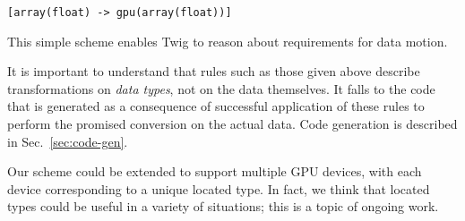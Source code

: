 \begin{verbatim}
[array(float) -> gpu(array(float))]
\end{verbatim}

This simple scheme enables Twig to reason about requirements for
data motion.

It is important to understand that rules such as those given above
describe transformations on \emph{data types}, not on the data
themselves. It falls to the code that is generated as a
consequence of successful application of these rules to perform
the promised conversion on the actual data. Code generation is
described in Sec.~\ref{sec:code-gen}.

Our scheme could be extended to support multiple GPU devices, with
each device corresponding to a unique located type. In fact, we
think that located types could be useful in a variety of
situations; this is a topic of ongoing work.

% 
% 
